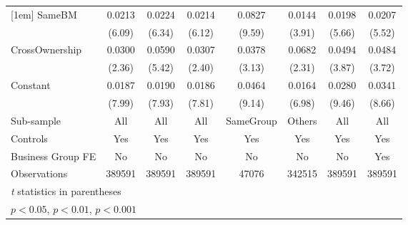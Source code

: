 {\begin{tabular}{l*{7}{c}}
[1em]
SameBM          &   0.0213\sym{***}&   0.0224\sym{***}&   0.0214\sym{***}&   0.0827\sym{***}&   0.0144\sym{***}&   0.0198\sym{***}&   0.0207\sym{***}\\
                &   (6.09)         &   (6.34)         &   (6.12)         &   (9.59)         &   (3.91)         &   (5.66)         &   (5.52)         \\
[1em]
CrossOwnership  &   0.0300\sym{*}  &   0.0590\sym{***}&   0.0307\sym{*}  &   0.0378\sym{**} &   0.0682\sym{*}  &   0.0494\sym{***}&   0.0484\sym{***}\\
                &   (2.36)         &   (5.42)         &   (2.40)         &   (3.13)         &   (2.31)         &   (3.87)         &   (3.72)         \\
[1em]
Constant        &   0.0187\sym{***}&   0.0190\sym{***}&   0.0186\sym{***}&   0.0464\sym{***}&   0.0164\sym{***}&   0.0280\sym{***}&   0.0341\sym{***}\\
                &   (7.99)         &   (7.93)         &   (7.81)         &   (9.14)         &   (6.98)         &   (9.46)         &   (8.66)         \\
\hline
Sub-sample      &      All         &      All         &      All         &SameGroup         &   Others         &      All         &      All         \\
Controls        &      Yes         &      Yes         &      Yes         &      Yes         &      Yes         &      Yes         &      Yes         \\
Business Group FE&       No         &       No         &       No         &       No         &       No         &       No         &      Yes         \\
Observations    &   389591         &   389591         &   389591         &    47076         &   342515         &   389591         &   389591         \\
\hline\hline
\multicolumn{8}{l}{\footnotesize \textit{t} statistics in parentheses}\\
\multicolumn{8}{l}{\footnotesize \sym{*} \(p<0.05\), \sym{**} \(p<0.01\), \sym{***} \(p<0.001\)}\\
\end{tabular}
}
